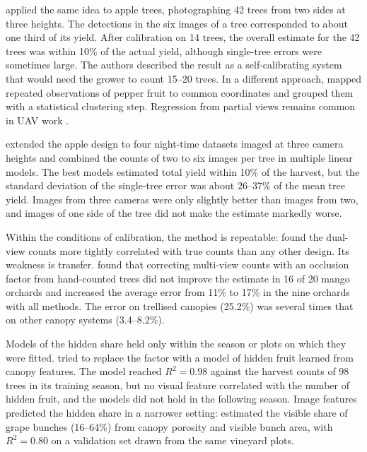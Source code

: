 \citet{linker2015estimation} applied the same idea to apple trees, photographing 42 trees from two sides at three heights. The detections in the six images of a tree corresponded to about one third of its yield. After calibration on 14 trees, the overall estimate for the 42 trees was within 10\% of the actual yield, although single-tree errors were sometimes large. The authors described the result as a self-calibrating system that would need the grower to count 15--20 trees. In a different approach, \citet{song2014automatic} mapped repeated observations of pepper fruit to common coordinates and grouped them with a statistical clustering step. Regression from partial views remains common in UAV work \citep{apoloapolo2020cloud,li2023blueberry}.

\citet{linker2017procedure} extended the apple design to four night-time datasets imaged at three camera heights and combined the counts of two to six images per tree in multiple linear models. The best models estimated total yield within 10\% of the harvest, but the standard deviation of the single-tree error was about 26--37\% of the mean tree yield. Images from three cameras were only slightly better than images from two, and images of one side of the tree did not make the estimate markedly worse.

Within the conditions of calibration, the method is repeatable: \citet{stein2016image} found the dual-view counts more tightly correlated with true counts than any other design. Its weakness is transfer. \citet{anderson2021estimation} found that correcting multi-view counts with an occlusion factor from hand-counted trees did not improve the estimate in 16 of 20 mango orchards and increased the average error from 11\% to 17\% in the nine orchards with all methods. The error on trellised canopies (25.2\%) was several times that on other canopy systems (3.4--8.2\%).

Models of the hidden share held only within the season or plots on which they were fitted. \citet{koirala2021attempting} tried to replace the factor with a model of hidden fruit learned from canopy features. The model reached $R^2=0.98$ against the harvest counts of 98 trees in its training season, but no visual feature correlated with the number of hidden fruit, and the models did not hold in the following season. Image features predicted the hidden share in a narrower setting: \citet{victorino2022overcoming} estimated the visible share of grape bunches (16--64\%) from canopy porosity and visible bunch area, with $R^2=0.80$ on a validation set drawn from the same vineyard plots.

